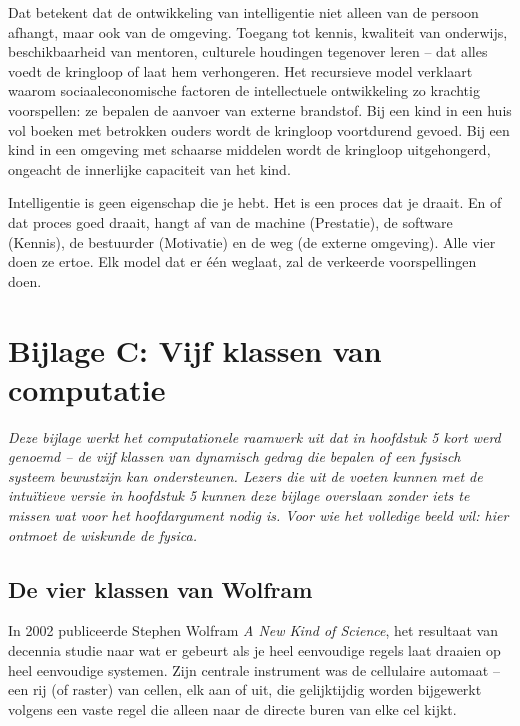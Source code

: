 \documentclass[11pt, twoside, openright]{book}
\begin{document}
Dat betekent dat de ontwikkeling van intelligentie niet alleen van de persoon afhangt, maar ook van de omgeving. Toegang tot kennis, kwaliteit van onderwijs, beschikbaarheid van mentoren, culturele houdingen tegenover leren -- dat alles voedt de kringloop of laat hem verhongeren. Het recursieve model verklaart waarom sociaaleconomische factoren de intellectuele ontwikkeling zo krachtig voorspellen: ze bepalen de aanvoer van externe brandstof. Bij een kind in een huis vol boeken met betrokken ouders wordt de kringloop voortdurend gevoed. Bij een kind in een omgeving met schaarse middelen wordt de kringloop uitgehongerd, ongeacht de innerlijke capaciteit van het kind.

Intelligentie is geen eigenschap die je hebt. Het is een proces dat je draait. En of dat proces goed draait, hangt af van de machine (Prestatie), de software (Kennis), de bestuurder (Motivatie) en de weg (de externe omgeving). Alle vier doen ze ertoe. Elk model dat er één weglaat, zal de verkeerde voorspellingen doen.


\chapter*{Bijlage C: Vijf klassen van computatie}

\textit{Deze bijlage werkt het computationele raamwerk uit dat in hoofdstuk 5 kort werd genoemd -- de vijf klassen van dynamisch gedrag die bepalen of een fysisch systeem bewustzijn kan ondersteunen. Lezers die uit de voeten kunnen met de intuïtieve versie in hoofdstuk 5 kunnen deze bijlage overslaan zonder iets te missen wat voor het hoofdargument nodig is. Voor wie het volledige beeld wil: hier ontmoet de wiskunde de fysica.}

\section*{De vier klassen van Wolfram}

In 2002 publiceerde Stephen Wolfram \textit{A New Kind of Science}, het resultaat van decennia studie naar wat er gebeurt als je heel eenvoudige regels laat draaien op heel eenvoudige systemen. Zijn centrale instrument was de cellulaire automaat -- een rij (of raster) van cellen, elk aan of uit, die gelijktijdig worden bijgewerkt volgens een vaste regel die alleen naar de directe buren van elke cel kijkt.
\end{document}
